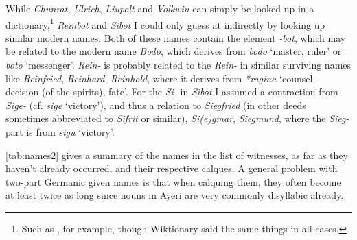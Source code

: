 \documentclass[12pt,paper=a4]{scrartcl}
\newcommand{\fw}[1]{\textit{#1}} %
\begin{document}
While \fw{Chunrat}, \fw{Ulrich}, \fw{Liupolt} and \fw{Volkwin} can simply 
be looked up in a dictionary,\footnote{Such as \textcite{duden:vornamen}, for 
example, though Wiktionary said the same things in all cases.} \fw{Reinbot} and 
\fw{Sibot} I could only guess at indirectly by looking up similar modern names.
Both of these names contain the element \fw{-bot}, which may be related to the 
modern name \fw{Bodo}, which derives from \Os{} \fw{bodo} `master, ruler' or 
\Ohg{} \fw{boto} `messenger'. \fw{Rein-} is probably related to the \fw{Rein-} 
in similar surviving names like \fw{Reinfried}, \fw{Reinhard}, \fw{Reinhold}, 
where it derives from \Gmc{} \fw{*ragina} `counsel, decision (of the spirits), 
fate'. For the \fw{Si-} in \fw{Sibot} I assumed a contraction from \fw{Sige-} 
(cf. \Mhg{} \fw{sige} `victory'), and thus a relation to \fw{Siegfried} (in 
other deeds sometimes abbreviated to \fw{Sifrit} or similar), \fw{Si(e)gmar}, 
\fw{Siegmund}, where the \fw{Sieg-} part is from \Ohg{} \fw{sigu} `victory'.

\autoref{tab:names2} gives a summary of the names in the list of witnesses, as 
far as they haven't already occurred, and their respective calques. A general 
problem with two-part Germanic given names is that when calquing them, they 
often become at least twice as long since nouns in Ayeri are very commonly 
disyllabic already.
\end{document}
